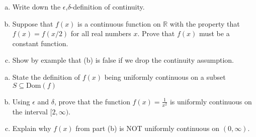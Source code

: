 \documentclass[11pt]{exam}
\theoremstyle{definition}
\begin{document}
\begin{questions}
\newpage
\question[10]\mbox{}

\begin{enumerate}[(a)]
\item Write down the $\epsilon$,$\delta$-definition of continuity.
\vspace{2in}
\item Suppose that $f(x)$ is a continuous function on $\mathbb{R}$ with the property that $f(x) = f(x/2)$ for all real numbers $x$.  Prove that $f(x)$ must be a constant function.
\vspace{3in}
\item Show by example that (b) is false if we drop the continuity assumption.
\end{enumerate}

\newpage
\question[10]\mbox{}

\begin{enumerate}[(a)]
\item State the definition of $f(x)$ being uniformly continuous on a subset $S\subseteq\text{Dom}(f)$
\vspace{1.5in}
\item Using $\epsilon$ and $\delta$, prove that the function $f(x) = \frac{1}{x^2}$ is uniformly continuous on the interval $[2,\infty)$.
\vspace{3in}
\item Explain why $f(x)$ from part (b) is NOT uniformly continuous on $(0,\infty)$.
\end{enumerate}


\end{questions}
\end{document}
